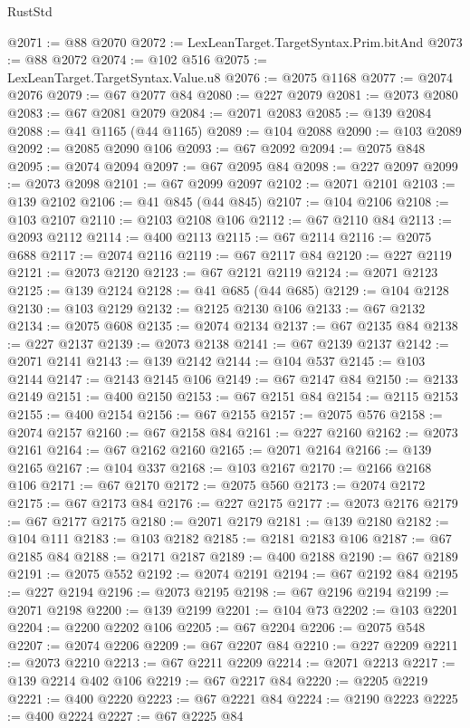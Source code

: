\begin{lexlean}{RustStd}
\begin{coremodule}
{\begin{coremodule}
{{{{{{{{{{{{{{{{{{{{{{{{{{@2071 := @88 @2070
@2072 := LexLeanTarget.TargetSyntax.Prim.bitAnd
@2073 := @88 @2072
@2074 := @102 @516
@2075 := LexLeanTarget.TargetSyntax.Value.u8
@2076 := @2075 @1168
@2077 := @2074 @2076
@2079 := @67 @2077 @84
@2080 := @227 @2079
@2081 := @2073 @2080
@2083 := @67 @2081 @2079
@2084 := @2071 @2083
@2085 := @139 @2084
@2088 := @41 @1165 (@44 @1165)
@2089 := @104 @2088
@2090 := @103 @2089
@2092 := @2085 @2090 @106
@2093 := @67 @2092
@2094 := @2075 @848
@2095 := @2074 @2094
@2097 := @67 @2095 @84
@2098 := @227 @2097
@2099 := @2073 @2098
@2101 := @67 @2099 @2097
@2102 := @2071 @2101
@2103 := @139 @2102
@2106 := @41 @845 (@44 @845)
@2107 := @104 @2106
@2108 := @103 @2107
@2110 := @2103 @2108 @106
@2112 := @67 @2110 @84
@2113 := @2093 @2112
@2114 := @400 @2113
@2115 := @67 @2114
@2116 := @2075 @688
@2117 := @2074 @2116
@2119 := @67 @2117 @84
@2120 := @227 @2119
@2121 := @2073 @2120
@2123 := @67 @2121 @2119
@2124 := @2071 @2123
@2125 := @139 @2124
@2128 := @41 @685 (@44 @685)
@2129 := @104 @2128
@2130 := @103 @2129
@2132 := @2125 @2130 @106
@2133 := @67 @2132
@2134 := @2075 @608
@2135 := @2074 @2134
@2137 := @67 @2135 @84
@2138 := @227 @2137
@2139 := @2073 @2138
@2141 := @67 @2139 @2137
@2142 := @2071 @2141
@2143 := @139 @2142
@2144 := @104 @537
@2145 := @103 @2144
@2147 := @2143 @2145 @106
@2149 := @67 @2147 @84
@2150 := @2133 @2149
@2151 := @400 @2150
@2153 := @67 @2151 @84
@2154 := @2115 @2153
@2155 := @400 @2154
@2156 := @67 @2155
@2157 := @2075 @576
@2158 := @2074 @2157
@2160 := @67 @2158 @84
@2161 := @227 @2160
@2162 := @2073 @2161
@2164 := @67 @2162 @2160
@2165 := @2071 @2164
@2166 := @139 @2165
@2167 := @104 @337
@2168 := @103 @2167
@2170 := @2166 @2168 @106
@2171 := @67 @2170
@2172 := @2075 @560
@2173 := @2074 @2172
@2175 := @67 @2173 @84
@2176 := @227 @2175
@2177 := @2073 @2176
@2179 := @67 @2177 @2175
@2180 := @2071 @2179
@2181 := @139 @2180
@2182 := @104 @111
@2183 := @103 @2182
@2185 := @2181 @2183 @106
@2187 := @67 @2185 @84
@2188 := @2171 @2187
@2189 := @400 @2188
@2190 := @67 @2189
@2191 := @2075 @552
@2192 := @2074 @2191
@2194 := @67 @2192 @84
@2195 := @227 @2194
@2196 := @2073 @2195
@2198 := @67 @2196 @2194
@2199 := @2071 @2198
@2200 := @139 @2199
@2201 := @104 @73
@2202 := @103 @2201
@2204 := @2200 @2202 @106
@2205 := @67 @2204
@2206 := @2075 @548
@2207 := @2074 @2206
@2209 := @67 @2207 @84
@2210 := @227 @2209
@2211 := @2073 @2210
@2213 := @67 @2211 @2209
@2214 := @2071 @2213
@2217 := @139 @2214 @402 @106
@2219 := @67 @2217 @84
@2220 := @2205 @2219
@2221 := @400 @2220
@2223 := @67 @2221 @84
@2224 := @2190 @2223
@2225 := @400 @2224
@2227 := @67 @2225 @84
}}}}}}}}}}}}}}}}}}}}}}}}}}
\end{coremodule}}
\end{coremodule}
\end{lexlean}
